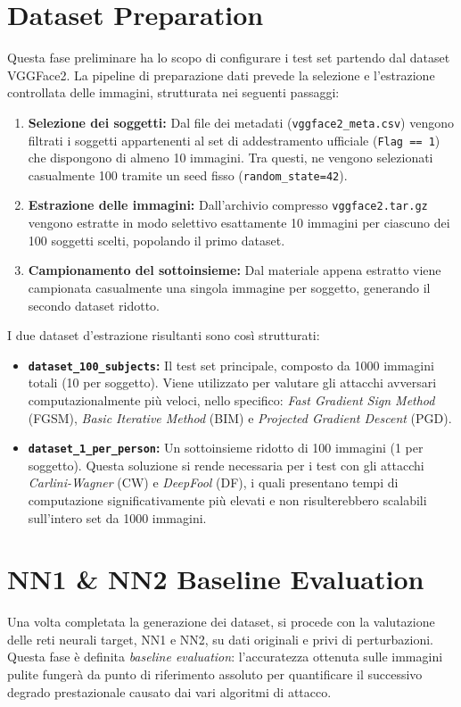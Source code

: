 \documentclass[a4paper, 12pt]{article}
\begin{document}
\section{Dataset Preparation}
Questa fase preliminare ha lo scopo di configurare i test set partendo dal dataset VGGFace2. La pipeline di preparazione dati prevede la selezione e l'estrazione controllata delle immagini, strutturata nei seguenti passaggi:
\begin{enumerate}
    \item \textbf{Selezione dei soggetti:} Dal file dei metadati (\texttt{vggface2\_meta.csv}) vengono filtrati i soggetti appartenenti al set di addestramento ufficiale (\texttt{Flag == 1}) che dispongono di almeno 10 immagini. Tra questi, ne vengono selezionati casualmente 100 tramite un seed fisso (\texttt{random\_state=42}).
    \item \textbf{Estrazione delle immagini:} Dall'archivio compresso \texttt{vggface2.tar.gz} vengono estratte in modo selettivo esattamente 10 immagini per ciascuno dei 100 soggetti scelti, popolando il primo dataset.
    \item \textbf{Campionamento del sottoinsieme:} Dal materiale appena estratto viene campionata casualmente una singola immagine per soggetto, generando il secondo dataset ridotto.
\end{enumerate}

I due dataset d'estrazione risultanti sono così strutturati:
\begin{itemize}
    \item \textbf{\texttt{dataset\_100\_subjects}:} Il test set principale, composto da 1000 immagini totali (10 per soggetto). Viene utilizzato per valutare gli attacchi avversari computazionalmente più veloci, nello specifico: \textit{Fast Gradient Sign Method} (FGSM), \textit{Basic Iterative Method} (BIM) e \textit{Projected Gradient Descent} (PGD).
    \item \textbf{\texttt{dataset\_1\_per\_person}:} Un sottoinsieme ridotto di 100 immagini (1 per soggetto). Questa soluzione si rende necessaria per i test con gli attacchi \textit{Carlini-Wagner} (CW) e \textit{DeepFool} (DF), i quali presentano tempi di computazione significativamente più elevati e non risulterebbero scalabili sull'intero set da 1000 immagini.
\end{itemize}

\clearpage
\section{NN1 \& NN2 Baseline Evaluation}
Una volta completata la generazione dei dataset, si procede con la valutazione delle reti neurali target, NN1 e NN2, su dati originali e privi di perturbazioni. Questa fase è definita \textit{baseline evaluation}: l'accuratezza ottenuta sulle immagini pulite fungerà da punto di riferimento assoluto per quantificare il successivo degrado prestazionale causato dai vari algoritmi di attacco. 
\end{document}
